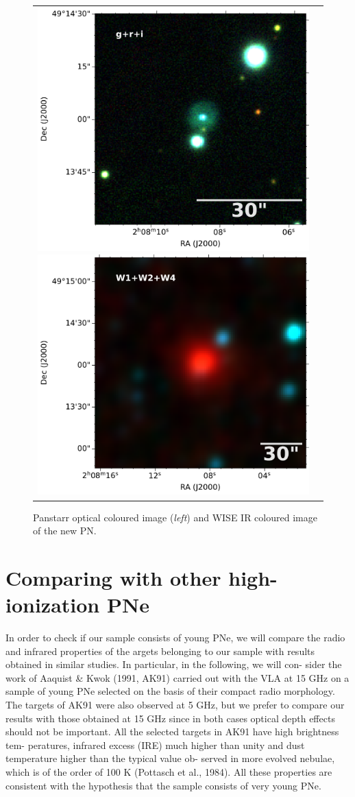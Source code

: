 \documentclass[fleqn,usenatbib]{mnras}
\begin{document}
\begin{figure}
  \centering
  \begin{tabular}{l l}
\includegraphics[width=0.5\linewidth]{Figs/cutout_rings_v3_skycell_2294_031_stk_i_unconv-irg-RGB.pdf}
\includegraphics[width=0.5\linewidth]{Figs/w4_ra32_035994_dec49_233615-421-RGB.pdf}
\end{tabular}  
  \caption{Panstarr optical coloured image (\textit{left}) and WISE IR coloured image of the new PN. } 
  \label{fig:image}
\end{figure}


\section{Comparing with other high-ionization PNe}
\label{sec:comp}

In order to check if our sample consists of young PNe,
we will compare the radio and infrared properties of the
argets belonging to our sample with results obtained in
similar studies. In particular, in the following, we will con-
sider the work of Aaquist & Kwok (1991, AK91) carried
out with the VLA at 15 GHz on a sample of young PNe
selected on the basis of their compact radio morphology.
The targets of AK91 were also observed at 5 GHz, but
we prefer to compare our results with those obtained at
15 GHz since in both cases optical depth effects should
not be important.
All the selected targets in AK91 have high brightness tem-
peratures, infrared excess (IRE) much higher than unity
and dust temperature higher than the typical value ob-
served in more evolved nebulae, which is of the order of
100 K (Pottasch et al., 1984). All these properties are
consistent with the hypothesis that the sample consists of
very young PNe.
\end{document}

